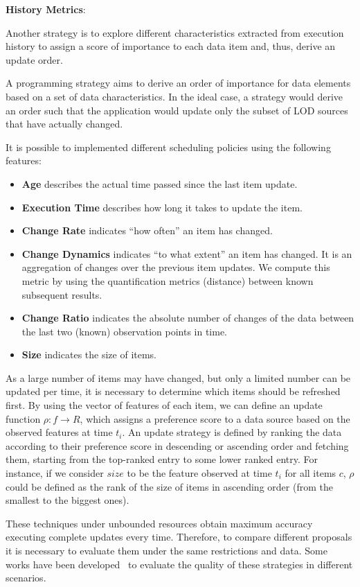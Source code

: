 \documentclass[sw]{iosart2x}
\begin{document}
\textbf{History Metrics}:

Another strategy is to explore different characteristics extracted from execution history to assign a score of importance to each data item and, thus, derive an update order.

A programming strategy aims to derive an order of importance for data elements based on a set of data characteristics. In the ideal case, a strategy would derive an order such that the application would update only the subset of LOD sources that have actually changed.

It is possible to implemented different scheduling policies using the following features:
\begin{itemize}
	\item \textbf{Age} describes the actual time passed since the last item update.
	\item \textbf{Execution Time} describes how long it takes to update the item.
	\item \textbf{Change Rate} indicates “how often” an item has changed.
	\item \textbf{Change Dynamics} indicates “to what extent” an item has changed. It is an aggregation of changes over the previous item updates. We compute this metric by using the quantification metrics (distance) between known subsequent results.
	\item \textbf{Change Ratio} indicates the absolute number of changes of the data between the last two (known) observation points in time.
	\item \textbf{Size} indicates the size of items.
\end{itemize}

As a large number of items may have changed, but only a limited number can be updated per time, it is necessary to determine which items should be refreshed first. By using the vector of features of each item, we can define an update function $ \rho: f \rightarrow R$, which assigns a preference score to a data source based on the observed features at time $t_i$. An update strategy is defined by ranking the data according to their preference score in descending or ascending order and fetching them, starting from the top-ranked entry to some lower ranked entry. For instance, if we consider $size$ to be the feature observed at time $t_i$ for all items $c$, $\rho$ could be defined as the rank of the size of items in ascending order (from the smallest to the biggest ones).

These techniques under unbounded resources obtain maximum accuracy executing complete updates every time. Therefore, to compare different proposals it is necessary to evaluate them under the same restrictions and data. Some works have been developed~\cite{DividinoGS15, KnuthHS16, AkhtarAL17} to evaluate the quality of these strategies in different scenarios.\\
\end{document}
